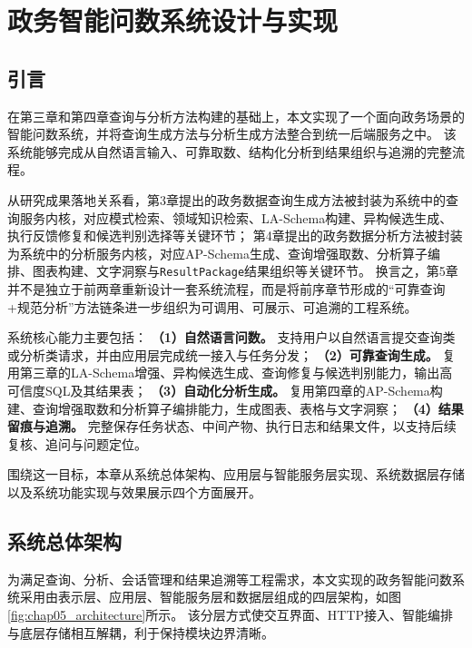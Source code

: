 \chapter{政务智能问数系统设计与实现}\label{chap:system_implementation}

\section{引言}
在第三章和第四章查询与分析方法构建的基础上，本文实现了一个面向政务场景的智能问数系统，并将查询生成方法与分析生成方法整合到统一后端服务之中。
该系统能够完成从自然语言输入、可靠取数、结构化分析到结果组织与追溯的完整流程。

从研究成果落地关系看，第3章提出的政务数据查询生成方法被封装为系统中的查询服务内核，对应模式检索、领域知识检索、LA-Schema构建、异构候选生成、执行反馈修复和候选判别选择等关键环节；
第4章提出的政务数据分析方法被封装为系统中的分析服务内核，对应AP-Schema生成、查询增强取数、分析算子编排、图表构建、文字洞察与\texttt{ResultPackage}结果组织等关键环节。
换言之，第5章并不是独立于前两章重新设计一套系统流程，而是将前序章节形成的“可靠查询+规范分析”方法链条进一步组织为可调用、可展示、可追溯的工程系统。

系统核心能力主要包括：
\textbf{（1）自然语言问数。} 支持用户以自然语言提交查询类或分析类请求，并由应用层完成统一接入与任务分发；
\textbf{（2）可靠查询生成。} 复用第三章的LA-Schema增强、异构候选生成、查询修复与候选判别能力，输出高可信度SQL及其结果表；
\textbf{（3）自动化分析生成。} 复用第四章的AP-Schema构建、查询增强取数和分析算子编排能力，生成图表、表格与文字洞察；
\textbf{（4）结果留痕与追溯。} 完整保存任务状态、中间产物、执行日志和结果文件，以支持后续复核、追问与问题定位。

围绕这一目标，本章从系统总体架构、应用层与智能服务层实现、系统数据层存储以及系统功能实现与效果展示四个方面展开。


\section{系统总体架构}

为满足查询、分析、会话管理和结果追溯等工程需求，本文实现的政务智能问数系统采用由表示层、应用层、智能服务层和数据层组成的四层架构，如图\ref{fig:chap05_architecture}所示。
该分层方式使交互界面、HTTP接入、智能编排与底层存储相互解耦，利于保持模块边界清晰。



